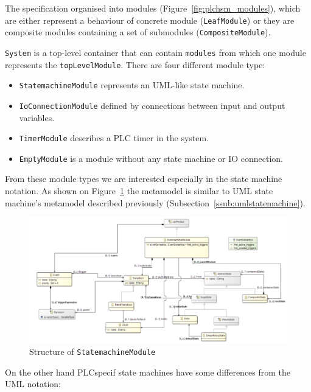 The specification organised into modules (Figure~\ref{fig:plchsm_modules}), which are either represent a behaviour of concrete module (\texttt{LeafModule}) or they are composite modules containing a set of submodules (\texttt{CompositeModule}).

\texttt{System} is a top-level container that can contain \texttt{modules} from which one module represents the \texttt{topLevelModule}. There are four different module type:

\begin{itemize}
	\item \texttt{StatemachineModule} represents an UML-like state machine.
	\item \texttt{IoConnectionModule} defined by connections between input and output variables.
	\item \texttt{TimerModule} describes a PLC timer in the system.
	\item \texttt{EmptyModule} is a module without any state machine or IO connection.
\end{itemize}

From these module types we are interested especially in the state machine notation. As shown on Figure~\ref{fig:plchsm_statemachine} the metamodel is similar to UML state machine's metamodel described previously (Subsection~\ref{ssub:umlstatemachine}).

\begin{figure}[htp]
\centering
\includegraphics[scale=0.5]{figures/plchsm_statemachine}
\caption{Structure of \texttt{StatemachineModule} \cite{plcspecif}}
\label{fig:plchsm_statemachine}
\end{figure}

On the other hand PLCspecif state machines have some differences from the UML notation:

